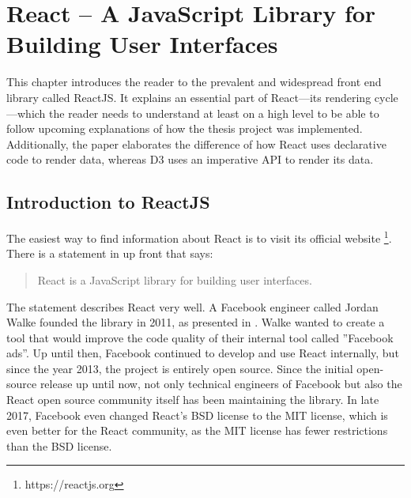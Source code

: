\chapter{React – A JavaScript Library for Building User Interfaces}
\label{cha:react}

This chapter introduces the reader to the prevalent and widespread front end library called ReactJS. It explains an essential part of React---its rendering cycle---which the reader needs to understand at least on a high level to be able to follow upcoming explanations of how the thesis project was implemented. Additionally, the paper elaborates the difference of how React uses declarative code to render data, whereas D3 uses an imperative API to render its data.

\section{Introduction to ReactJS}
\label{sec:reactIntro}

The easiest way to find information about React is to visit its official website \footnote{https://reactjs.org}. There is a statement in \cite{React} up front that says: \begin{quote}\begin{english}React is a JavaScript library for building user interfaces.\end{english}\end{quote} The statement describes React very well. A Facebook engineer called Jordan Walke founded the library in 2011, as presented in \cite[05:30]{ReactFoundingVideo}. Walke wanted to create a tool that would improve the code quality of their internal tool called ''Facebook ads''. Up until then, Facebook continued to develop and use React internally, but since the year 2013, the project is entirely open source. Since the initial open-source release up until now, not only technical engineers of Facebook but also the React open source community itself has been maintaining the library. In late 2017, Facebook even changed React's BSD license to the MIT license, which is even better for the React community, as the MIT license has fewer restrictions than the BSD license.

